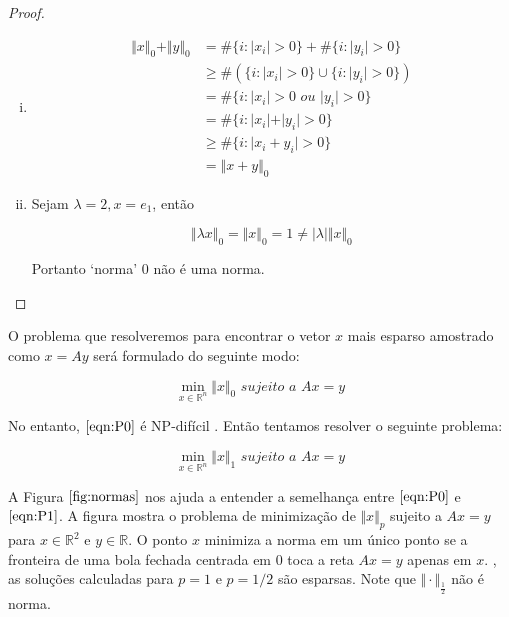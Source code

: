 \begin{proof}
\begin{enumerate}[(i)]
\item
\begin{subequations}
\begin{align*}
\Vert x \Vert_0 + \Vert y \Vert_0 & = \# \lbrace i : \vert x_i \vert > 0 \rbrace
									+ \# \lbrace i : \vert y_i \vert > 0 \rbrace \\
& \geq \#(\lbrace i : \vert x_i \vert > 0 \rbrace \cup \lbrace i : \vert y_i \vert > 0 \rbrace) \\
& = \# \lbrace i : \vert x_i \vert > 0 \textit{ ou } \vert y_i \vert > 0 \rbrace \\
& = \# \lbrace i : \vert x_i \vert + \vert y_i \vert > 0 \rbrace \\
& \geq  \# \lbrace i : \vert x_i + y_i \vert > 0\rbrace \\
& = \Vert x + y \Vert_0
\end{align*}
\end{subequations}

\item Sejam $\lambda = 2, x = e_1$, então

$$ \Vert \lambda x \Vert_0 = \Vert x \Vert_0 = 1 \neq \vert \lambda \vert \Vert x \Vert_0 $$

Portanto `norma' $0$ não é uma norma.
\end{enumerate}
\end{proof}

O problema que resolveremos para encontrar o vetor $x$ mais esparso amostrado como $x = Ay$ será formulado do seguinte modo:

\begin{equation}
\tag{$P_0$}
\min_{x \in \mathbb{R}^n} \Vert x \Vert_{0} \textit{ sujeito a } Ax = y
\label{eqn:P0}
\end{equation}

No entanto, $\eqref{eqn:P0}$ é NP-difícil \cite{fourau}. Então tentamos resolver o seguinte problema:

\begin{equation}
\tag{$P_1$}
\min_{x \in \mathbb{R}^n} \Vert x \Vert_{1} \textit{ sujeito a } Ax = y
\label{eqn:P1}
\end{equation}

A Figura $\ref{fig:normas}$ nos ajuda a entender a semelhança entre $\eqref{eqn:P0}$ e $\eqref{eqn:P1}$. A figura mostra o problema de minimização de $\Vert x \Vert_p$ sujeito a $Ax = y$ para $x \in \mathbb{R}^2$ e $y \in \mathbb{R}$. O ponto $x$ minimiza a norma em um único ponto se a fronteira de uma bola fechada centrada em $0$ toca a reta $Ax = y$ apenas em $x$. , as soluções calculadas para $p = 1$ e $p = 1/2$ são esparsas. Note que $\Vert \cdot \Vert_{\frac{1}{2}}$ não é norma.

